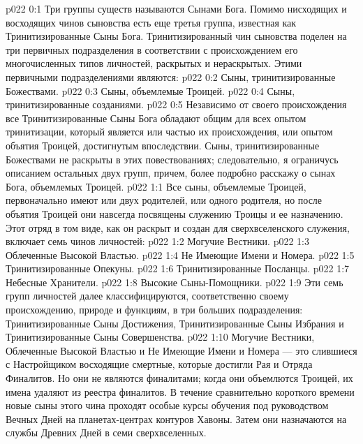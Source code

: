 \author{Могучий Вестник}
\vs p022 0:1 Три группы существ называются Сынами Бога. Помимо нисходящих и восходящих чинов сыновства есть еще третья группа, известная как Тринитизированные Сыны Бога. Тринитизированный чин сыновства поделен на три первичных подразделения в соответствии с происхождением его многочисленных типов личностей, раскрытых и нераскрытых. Этими первичными подразделениями являются:
\vs p022 0:2 \bibnobreakspace Сыны, тринитизированные Божествами.
\vs p022 0:3 \bibnobreakspace Сыны, объемлемые Троицей.
\vs p022 0:4 \bibnobreakspace Сыны, тринитизированные созданиями.
\vs p022 0:5 Независимо от своего происхождения все Тринитизированные Сыны Бога обладают общим для всех опытом тринитизации, который является или частью их происхождения, или опытом объятия Троицей, достигнутым впоследствии. Сыны, тринитизированные Божествами не раскрыты в этих повествованиях; следовательно, я ограничусь описанием остальных двух групп, причем, более подробно расскажу о сынах Бога, объемлемых Троицей.
\vs p022 1:1 Все сыны, объемлемые Троицей, первоначально имеют или двух родителей, или одного родителя, но после объятия Троицей они навсегда посвящены служению Троицы и ее назначению. Этот отряд в том виде, как он раскрыт и создан для сверхвселенского служения, включает семь чинов личностей:
\vs p022 1:2 \bibnobreakspace Могучие Вестники.
\vs p022 1:3 \bibnobreakspace Облеченные Высокой Властью.
\vs p022 1:4 \bibnobreakspace Не Имеющие Имени и Номера.
\vs p022 1:5 \bibnobreakspace Тринитизированные Опекуны.
\vs p022 1:6 \bibnobreakspace Тринитизированные Посланцы.
\vs p022 1:7 \bibnobreakspace Небесные Хранители.
\vs p022 1:8 \bibnobreakspace Высокие Сыны\hyp{}Помощники.
\vs p022 1:9 \pc Эти семь групп личностей далее классифицируются, соответственно своему происхождению, природе и функциям, в три больших подразделения: Тринитизированные Сыны Достижения, Тринитизированные Сыны Избрания и Тринитизированные Сыны Совершенства.
\vs p022 1:10 \pc {} Могучие Вестники, Облеченные Высокой Властью и Не Имеющие Имени и Номера --- это слившиеся с Настройщиком восходящие смертные, которые достигли Рая и Отряда Финалитов. Но они не являются финалитами; когда они объемлются Троицей, их имена удаляют из реестра финалитов. В течение сравнительно короткого времени новые сыны этого чина проходят особые курсы обучения под руководством Вечных Дней на планетах\hyp{}центрах контуров Хавоны. Затем они назначаются на службы Древних Дней в семи сверхвселенных.
